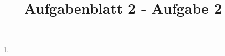\documentclass{article}
\title{Aufgabenblatt 2 - Aufgabe 2}
\author{}
\begin{document}
\maketitle

\begin{enumerate}
\item
\end{enumerate}
\end{document}
